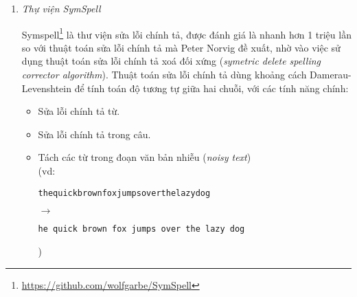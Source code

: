 \begin{enumerate}
    \item \textit{Thự viện SymSpell}

          Symspell\footnote{\url{https://github.com/wolfgarbe/SymSpell}} là thư viện sửa lỗi chính tả, được đánh giá là nhanh hơn 1 triệu lần so với thuật toán sửa lỗi chính tả mà Peter Norvig đề xuất, nhờ vào việc sử dụng thuật toán sửa lỗi chính tả xoá đối xứng (\textit{symetric delete spelling corrector algorithm}). Thuật toán sửa lỗi chính tả dùng khoảng cách Damerau-Levenshtein để tính toán độ tương tự giữa hai chuỗi, với các tính năng chính:
          \begin{itemize}
              \item Sửa lỗi chính tả từ.
              \item Sửa lỗi chính tả trong câu.
              \item Tách các từ trong đoạn văn bản nhiễu (\textit{noisy text})\\(vd: {\raggedright\texttt{thequickbrownfoxjumpsoverthelazydog}\par} $\to$ {\raggedright\texttt{he quick brown fox jumps over the lazy dog}\par})
          \end{itemize}
\end{enumerate}

